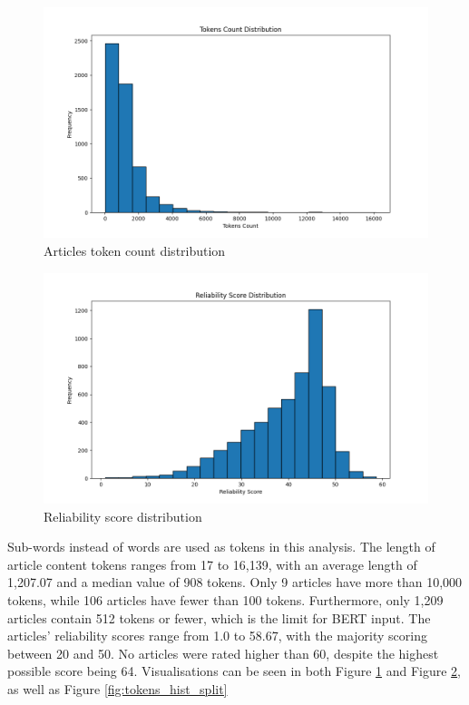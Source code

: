 \begin{figure}[htbp]
    \centering
    \includegraphics[width=0.9\linewidth]{figures/tokens_count_vx_hist.png}
    \caption{Articles token count distribution}
    \label{fig:tokens_hist}
\end{figure}

\begin{figure}[htbp]
    \centering
    \includegraphics[width=0.9\linewidth]{figures/reliability_score_hist.png}
    \caption{Reliability score distribution}
    \label{fig:reliability_score_hist}
\end{figure}

Sub-words instead of words are used as tokens in this analysis. The length of article content tokens ranges from 17 to 16,139, with an average length of 1,207.07 and a median value of 908 tokens. Only 9 articles have more than 10,000 tokens, while 106 articles have fewer than 100 tokens. Furthermore, only 1,209 articles contain 512 tokens or fewer, which is the limit for BERT input. The articles' reliability scores range from 1.0 to 58.67, with the majority scoring between 20 and 50. No articles were rated higher than 60, despite the highest possible score being 64. Visualisations can be seen in both Figure \ref{fig:tokens_hist} and Figure \ref{fig:reliability_score_hist}, as well as Figure \ref{fig:tokens_hist_split}

